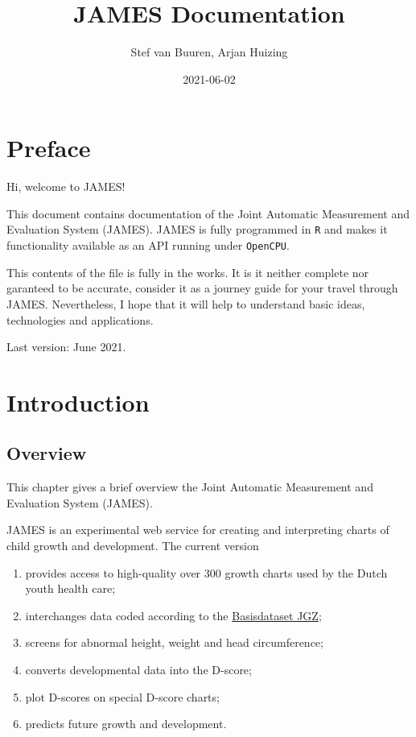 \documentclass[
]{book}
\title{JAMES Documentation}
\author{Stef van Buuren, Arjan Huizing}
\date{2021-06-02}
\providecommand{\tightlist}{%
  \setlength{\itemsep}{0pt}\setlength{\parskip}{0pt}}
\begin{document}
\maketitle

{
\setcounter{tocdepth}{1}
\tableofcontents
}
\hypertarget{preface}{%
\chapter*{Preface}\label{preface}}

Hi, welcome to JAMES!

This document contains documentation of the Joint Automatic Measurement and Evaluation System (JAMES). JAMES is fully programmed in \texttt{R} and makes it functionality available as an API running under \texttt{OpenCPU}.

This contents of the file is fully in the works. It is it neither complete nor garanteed to be accurate, consider it as a journey guide for your travel through JAMES. Nevertheless, I hope that it will help to understand basic ideas, technologies and applications.

Last version: June 2021.

\hypertarget{intro}{%
\chapter{Introduction}\label{intro}}

\hypertarget{overview}{%
\section{Overview}\label{overview}}

This chapter gives a brief overview the Joint Automatic Measurement and Evaluation System (JAMES).

JAMES is an experimental web service for creating and interpreting charts of child growth and
development. The current version

\begin{enumerate}
\def\labelenumi{\arabic{enumi}.}
\tightlist
\item
  provides access to high-quality over 300 growth charts used by the Dutch youth health care;
\item
  interchanges data coded according to the \href{https://www.ncj.nl/themadossiers/informatisering/basisdataset/documentatie/?cat=13}{Basisdataset JGZ};
\item
  screens for abnormal height, weight and head circumference;
\item
  converts developmental data into the D-score;
\item
  plot D-scores on special D-score charts;
\item
  predicts future growth and development.
\end{enumerate}
\end{document}
